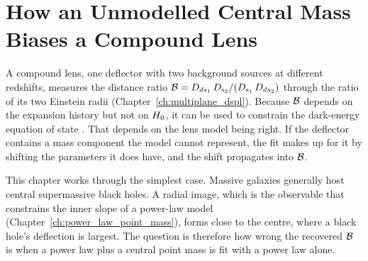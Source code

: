 
\chapter{How an Unmodelled Central Mass Biases a Compound Lens}
\label{ch:central_mass_bias}

\noindent
A compound lens, one deflector with two background sources at different
redshifts, measures the distance ratio
$\mathcal{B} = D_{ds_1}\,D_{\mathrm{s}_2}/(D_{\mathrm{s}_1}\,D_{ds_2})$
through the ratio of its two Einstein radii
(Chapter~\ref{ch:multiplane_dspl}). Because $\mathcal{B}$ depends on the
expansion history but not on $H_0$, it can be used to constrain the
dark-energy equation of state \citep{collett_2012}. That depends on the
lens model being right. If the deflector contains a mass component the
model cannot represent, the fit makes up for it by shifting the
parameters it does have, and the shift propagates into $\mathcal{B}$.

This chapter works through the simplest case. Massive galaxies generally
host central supermassive black holes. A radial image, which is the
observable that constrains the inner slope of a power-law model
(Chapter~\ref{ch:power_law_point_mass}), forms close to the centre,
where a black hole's deflection is largest. The question is therefore
how wrong the recovered $\mathcal{B}$ is when a power law plus a central
point mass is fit with a power law alone.

